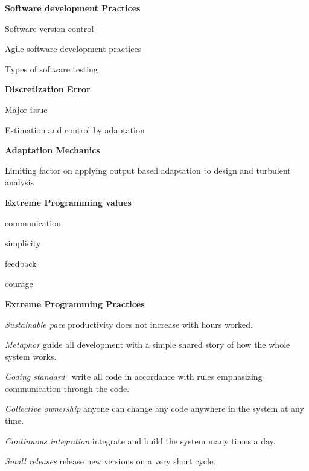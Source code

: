 \documentclass[landscape]{slides}
\renewcommand{\title}[1]{{\large\bfseries #1}}
\newenvironment{itemiz}%
  {\begin{list}{}{\raggedright
      \setlength{\itemsep}{2pt}%
      \setlength{\parskip}{4pt}\setlength{\parsep}{2pt}}}%
  {\end{list}}%
\begin{document}
 \begin{slide}
   \title{ Software development Practices }
   \begin{itemiz}
   \item Software version control
   \item Agile software development practices
   \item Types of software testing
   \end{itemiz}
   \title{ Discretization Error }
   \begin{itemiz}
   \item Major issue
   \item Estimation and control by adaptation
   \end{itemiz}
   \title{ Adaptation Mechanics }
   \begin{itemiz}
   \item Limiting factor on applying output based adaptation to design
   and turbulent analysis
   \end{itemiz}
 \end{slide}
 
 \begin{slide}
  \title{Extreme Programming \normalfont\normalsize values}
  \setlength{\topsep}{0pt}\setlength{\parskip}{5pt}
  \begin{itemiz}
   \item communication
   \item simplicity
   \item feedback
   \item courage
  \end{itemiz}
 \end{slide}
 
 \begin{slide}
  \title{Extreme Programming Practices}
  \begin{itemiz}
    \item[\textit{Sustainable pace}]
      {\small productivity does not increase with hours worked.}
    \item[\textit{Metaphor}]
      {\small guide all development with a simple shared story of how
      the whole system works.}
    \item[\textit{Coding standard}]
      {\small\ write all code in accordance with rules emphasizing
      communication through the code.}
    \item[\textit{Collective ownership}]
      {\small anyone can change any code anywhere in the system at any time.}
    \item[\textit{Continuous integration}]
      {\small integrate and build the system many times a day.}
    \item[\textcolor{mediumGray}{\textit{Small releases}}]
      {\small release new versions on a very short cycle.}
   \end{itemiz}
 \end{slide}
  
\end{document}
